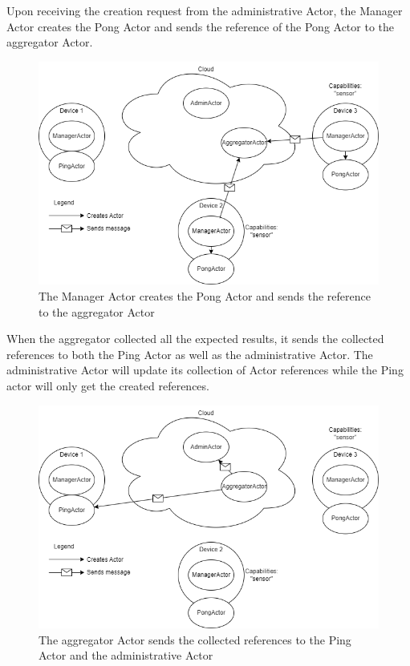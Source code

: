 \documentclass[a4paper]{article}
\begin{document}
Upon receiving the creation request from the administrative Actor, the Manager Actor creates the Pong Actor and sends the reference of the Pong Actor to the aggregator Actor.
\begin{figure}[H]
    \centering
    \includegraphics[scale=0.5]{createActor3.png}
    \caption{The Manager Actor creates the Pong Actor and sends the reference to the aggregator Actor}
    \label{fig:createActor3}
\end{figure}
When the aggregator collected all the expected results, it sends the collected references to both the Ping Actor as well as the administrative Actor. The administrative Actor will update its collection of Actor references while the Ping actor will only get the created references.
\begin{figure}[H]
    \centering
    \includegraphics[scale=0.5]{createActor4.png}
    \caption{The aggregator Actor sends the collected references to the Ping Actor and the administrative Actor}
    \label{fig:createActor4}
\end{figure}
\end{document}
